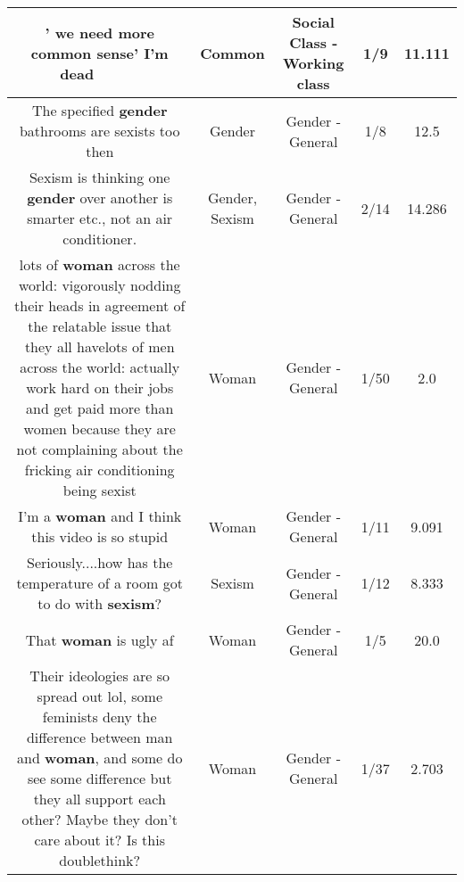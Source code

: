 \documentclass[11pt]{article}
\newlength\mylength
\begin{document}
\begin{center}
\begin{longtable}{|C{.65\mylength}|C{.30\mylength}|C{.12\mylength}|C{.12\mylength}|C{.12\mylength}|}
  \small ' we need more \textbf{common} sense' I'm dead 🤣🤣🤣🤣🤣🤣🤣🤣🤣🤣\normalsize   & Common & Social Class - Working class & 1/9 & 11.111 \\  \hline
  \small The specified \textbf{gender} bathrooms are sexists too then\normalsize   & Gender & Gender - General & 1/8 & 12.5 \\  \hline
  \small Sexism is thinking one \textbf{gender} over another is smarter etc., not an air conditioner.\normalsize   & Gender, Sexism & Gender - General & 2/14 & 14.286 \\  \hline
  \small lots of \textbf{woman} across the world: vigorously nodding their heads in agreement of the relatable issue that they all havelots of men across the world: actually work hard on their jobs and get paid more than women because they are not complaining about the fricking air conditioning being sexist\normalsize   & Woman & Gender - General & 1/50 & 2.0 \\  \hline
  \small I'm a \textbf{woman} and I think this video is so stupid\normalsize   & Woman & Gender - General & 1/11 & 9.091 \\  \hline
  \small Seriously....how has the temperature of a room got to do with \textbf{sexism}?\normalsize   & Sexism & Gender - General & 1/12 & 8.333 \\  \hline
  \small That \textbf{woman} is ugly af\normalsize   & Woman & Gender - General & 1/5 & 20.0 \\  \hline
  \small Their ideologies are so spread out lol, some feminists deny the difference between man and \textbf{woman}, and some do see some difference but they all support each other? Maybe they don't care about it? Is this doublethink?\normalsize   & Woman & Gender - General & 1/37 & 2.703 \\  \hline

\end{longtable}
\end{center}
\end{document}
